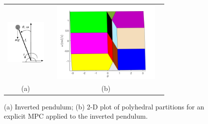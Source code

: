 % 


\begin{figure}[h]
	\begin{tabular}{cc}
	\includegraphics[width=2cm,height=3cm]{Figs/inverted_pendulum.pdf}&	\includegraphics[width=6cm,height=4cm]{Figs/regs.jpg}\\
	(a)&(b)
	\end{tabular}
	\caption{(a) Inverted pendulum; (b) 2-D plot of polyhedral partitions for an explicit MPC applied to the inverted pendulum.}
	\label{fig:inverted_pendulum}
\end{figure}

